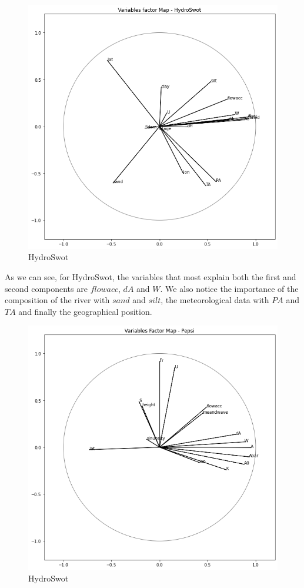  \begin{figure}[H]
     \centering
     \includegraphics[scale = 0.3]{Graph/factor_map_hydro.png}
     \caption{HydroSwot}
     \label{fig:my_label}
 \end{figure}


As we can see, for HydroSwot, the variables that most explain both the first and second components are $flowacc$, $dA$ and $W$. We also notice the importance of the composition of the river with $sand$ and $silt$, the meteorological data with $PA$ and $TA$ and finally the geographical position. 



 \begin{figure}[H]
     \centering
     \includegraphics[scale = 0.3]{Graph/factor_map_pepsi.png}
     \caption{HydroSwot}
     \label{fig:my_label}
 \end{figure}

